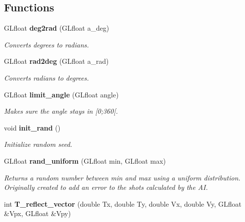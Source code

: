 \subsection*{Functions}
\begin{CompactItemize}
\item 
GLfloat {\bf deg2rad} (GLfloat a\_\-deg)\label{iteam__maths_8cpp_3058d94a2d148c090c62712dd1a0a215}

\begin{CompactList}\small\item\em Converts degrees to radians. \item\end{CompactList}\item 
GLfloat {\bf rad2deg} (GLfloat a\_\-rad)\label{iteam__maths_8cpp_b95d84f6a14b4237d444c97611da6bea}

\begin{CompactList}\small\item\em Converts radians to degrees. \item\end{CompactList}\item 
GLfloat {\bf limit\_\-angle} (GLfloat angle)\label{iteam__maths_8cpp_fba60a0485018bb94efdde2c82906285}

\begin{CompactList}\small\item\em Makes sure the angle stays in [0;360[. \item\end{CompactList}\item 
void {\bf init\_\-rand} ()\label{iteam__maths_8cpp_ce6a4b0f49666a9bc4b4b1bee884d480}

\begin{CompactList}\small\item\em Initialize random seed. \item\end{CompactList}\item 
GLfloat {\bf rand\_\-uniform} (GLfloat min, GLfloat max)\label{iteam__maths_8cpp_09ad0f4f0bd2d75bca4401a28bb5e2a8}

\begin{CompactList}\small\item\em Returns a random number between min and max using a uniform distribution. Originally created to add an error to the shots calculated by the AI. \item\end{CompactList}\item 
int {\bf T\_\-reflect\_\-vector} (double Tx, double Ty, double Vx, double Vy, GLfloat \&Vpx, GLfloat \&Vpy)\label{iteam__maths_8cpp_4fe21ddfcb8e616e08adcb1bfd42e718}


\end{CompactItemize}
